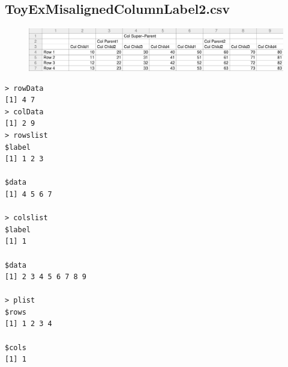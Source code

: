 \documentclass[a4paper]{article}
\begin{document}
\subsection{ToyExMisalignedColumnLabel2.csv}
\label{sec:TCRO_ToyExMisalignedColumnLabel2.csv}
\begin{figure}[!h]
\centering
\includegraphics[width=\textwidth]{./TestCase/ToyExMisalignedColumnLabel2.pdf}
\end{figure}
\begin{verbatim}
> rowData 
[1] 4 7
> colData 
[1] 2 9
> rowslist 
$label
[1] 1 2 3

$data
[1] 4 5 6 7

> colslist 
$label
[1] 1

$data
[1] 2 3 4 5 6 7 8 9

> plist 
$rows
[1] 1 2 3 4

$cols
[1] 1


\end{verbatim}
\end{document}
